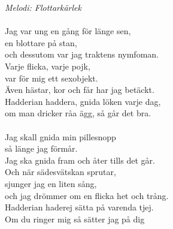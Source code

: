 {\footnotesize\textit{Melodi: Flottarkärlek}}\\
\\
Jag var ung en gång för länge sen,\\
en blottare på stan,\\
och dessutom var jag traktens nymfoman.\\
Varje flicka, varje pojk,\\
var för mig ett sexobjekt.\\
Även hästar, kor och får har jag betäckt.\\
Hadderian haddera, gnida löken varje dag,\\
om man dricker råa ägg, så går det bra.\\
\\
Jag skall gnida min pillesnopp\\
så länge jag förmår.\\
Jag ska gnida fram och åter tills det går.\\
Och när sädesvätskan sprutar,\\
sjunger jag en liten sång,\\
och jag drömmer om en flicka het och trång.\\
Hadderian haderej sätta på varenda tjej.\\
Om du ringer mig så sätter jag på dig
